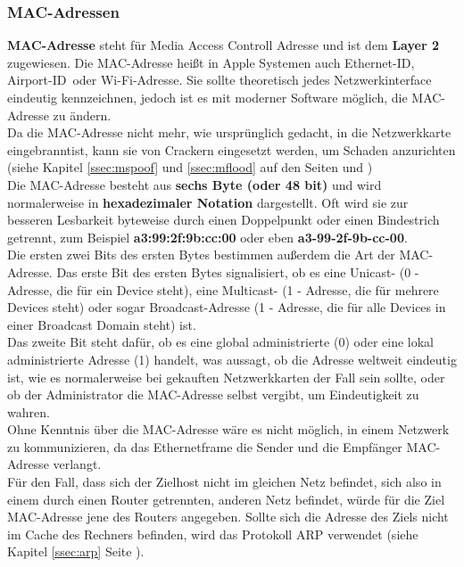 \documentclass[12pt,a4paper]{report}
\begin{document}
\subsubsection{MAC-Adressen}\label{sssec:macaddr}
\textbf{MAC-Adresse} steht für Media Access Controll Adresse und ist dem \textbf{Layer 2} zugewiesen. Die MAC-Adresse heißt in Apple Systemen auch \glqq Ethernet-ID\grqq , \glqq Airport-ID\grqq \ oder \glqq Wi-Fi-Adresse\grqq . Sie sollte theoretisch jedes Netzwerkinterface eindeutig kennzeichnen, jedoch ist es mit moderner Software möglich, die MAC-Adresse zu ändern.\\
Da die MAC-Adresse nicht mehr, wie ursprünglich gedacht, in die Netzwerkkarte \glqq eingebrannt\grqq ist, kann sie von Crackern eingesetzt werden, um Schaden anzurichten (siehe Kapitel \ref{ssec:mspoof} und \ref{ssec:mflood} auf den Seiten \pageref{ssec:mspoof} und \pageref{ssec:mflood})\\

Die MAC-Adresse besteht aus \textbf{sechs Byte (oder 48 bit)} und wird normalerweise in \textbf{hexadezimaler Notation} dargestellt. Oft wird sie zur besseren Lesbarkeit byteweise durch einen Doppelpunkt oder einen Bindestrich getrennt, zum Beispiel \textbf{a3:99:2f:9b:cc:00} oder eben \textbf{a3-99-2f-9b-cc-00}.\\

Die ersten zwei Bits des ersten Bytes bestimmen außerdem die Art der MAC-Adresse. Das erste Bit des ersten Bytes signalisiert, ob es eine Unicast- (0 - Adresse, die für ein Device steht), eine Multicast-   (1 - Adresse, die für mehrere Devices steht) oder sogar Broadcast-Adresse (1 - Adresse, die für alle Devices in einer Broadcast Domain steht) ist.\\
Das zweite Bit steht dafür, ob es eine global administrierte (0) oder eine lokal administrierte Adresse (1) handelt, was aussagt, ob die Adresse weltweit eindeutig ist, wie es normalerweise bei gekauften Netzwerkkarten der Fall sein sollte, oder ob der Administrator die MAC-Adresse selbst vergibt, um Eindeutigkeit zu wahren.\\

Ohne Kenntnis über die MAC-Adresse wäre es nicht möglich, in einem Netzwerk zu kommunizieren, da das Ethernetframe die Sender und die Empfänger MAC-Adresse verlangt.\\
Für den Fall, dass sich der Zielhost nicht im gleichen Netz befindet, sich also in einem durch einen Router getrennten, anderen Netz befindet, würde für die Ziel MAC-Adresse jene des Routers angegeben. Sollte sich die Adresse des Ziels nicht im Cache des Rechners befinden, wird das Protokoll ARP verwendet (siehe Kapitel \ref{ssec:arp} Seite \pageref{ssec:arp}). 
\end{document}
